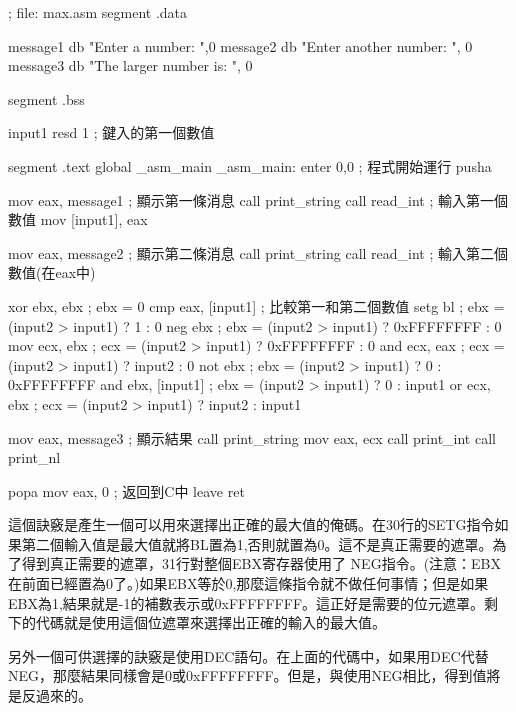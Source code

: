\begin{AsmCodeListing}
; file: max.asm
segment .data

message1 db "Enter a number: ",0
message2 db "Enter another number: ", 0
message3 db "The larger number is: ", 0

segment .bss

input1  resd    1        ; 鍵入的第一個數值

segment .text
        global  _asm_main
_asm_main:
        enter   0,0               ; 程式開始運行
        pusha

        mov     eax, message1     ; 顯示第一條消息
        call    print_string
        call    read_int          ; 輸入第一個數值
        mov     [input1], eax

        mov     eax, message2     ; 顯示第二條消息
        call    print_string
        call    read_int          ; 輸入第二個數值(在eax中)

        xor     ebx, ebx          ; ebx = 0
        cmp     eax, [input1]     ; 比較第一和第二個數值
        setg    bl                ; ebx = (input2 > input1) ?          1 : 0
        neg     ebx               ; ebx = (input2 > input1) ? 0xFFFFFFFF : 0
        mov     ecx, ebx          ; ecx = (input2 > input1) ? 0xFFFFFFFF : 0
        and     ecx, eax          ; ecx = (input2 > input1) ?     input2 : 0
        not     ebx               ; ebx = (input2 > input1) ?      0 : 0xFFFFFFFF
        and     ebx, [input1]     ; ebx = (input2 > input1) ?          0 : input1
        or      ecx, ebx          ; ecx = (input2 > input1) ?     input2 : input1

        mov     eax, message3     ; 顯示結果
        call    print_string
        mov     eax, ecx
        call    print_int
        call    print_nl

        popa
        mov     eax, 0            ; 返回到C中
        leave
        ret
\end{AsmCodeListing}

這個訣竅是產生一個可以用來選擇出正確的最大值的俺碼。在30行的{\code SETG}指令如果第二個輸入值是最大值就將BL置為1,否則就置為0。這不是真正需要的遮罩。為了得到真正需要的遮罩，31行對整個EBX寄存器使用了
{\code NEG}指令。(注意：EBX在前面已經置為0了。)如果EBX等於0,那麼這條指令就不做任何事情；但是如果EBX為1,結果就是-1的補數表示或0xFFFFFFFF。這正好是需要的位元遮罩。剩下的代碼就是使用這個位遮罩來選擇出正確的輸入的最大值。

另外一個可供選擇的訣竅是使用{\code DEC}語句。在上面的代碼中，如果用{\code DEC}代替{\code NEG}，那麼結果同樣會是0或0xFFFFFFFF。但是，與使用{\code NEG}相比，得到值將是反過來的。


